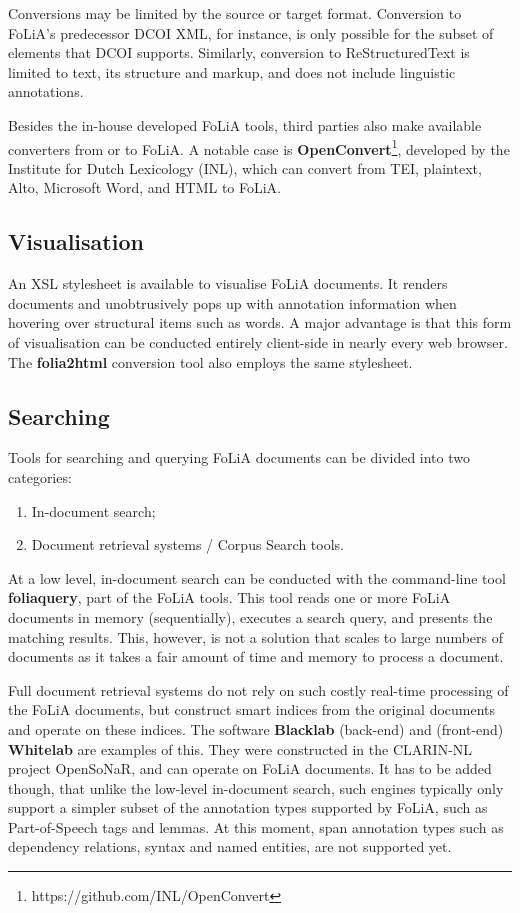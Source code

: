 \documentclass[a4paper,11pt]{article}
\begin{document}
Conversions may be limited by the source or target format. Conversion to
FoLiA's predecessor DCOI XML, for instance, is only possible for the subset of
elements that DCOI supports. Similarly, conversion to
ReStructuredText is limited
to text, its structure and markup, and does not include linguistic annotations.

Besides the in-house developed FoLiA tools, third parties also make available
converters from or to FoLiA. A notable case is
\textbf{OpenConvert}\footnote{https://github.com/INL/OpenConvert}, developed by the Institute for Dutch Lexicology (INL), which can convert from TEI, plaintext, Alto, Microsoft Word, and HTML to
FoLiA.

\subsection{Visualisation}

An XSL stylesheet is available to visualise FoLiA documents. It renders
documents and unobtrusively pops up with annotation information when hovering
over structural items such as words. A major advantage is that this form of
visualisation can be conducted entirely client-side in nearly every
web browser. The \textbf{folia2html} conversion tool also employs the same
stylesheet.

\subsection{Searching}

Tools for searching and querying FoLiA documents can be divided into two
categories:

\begin{enumerate}
 \item In-document search;
 \item Document retrieval systems / Corpus Search tools.
\end{enumerate}

At a low level, in-document search can be conducted with the command-line tool
\textbf{foliaquery}, part of the FoLiA tools. This tool reads one or more FoLiA
documents in memory (sequentially), executes a search query, and presents the
matching results. This, however, is not a solution that scales to large
numbers of documents as it takes a fair amount of time and memory to process a document.

Full document retrieval systems do not rely on such costly real-time processing
of the FoLiA documents, but construct smart indices from the original documents
and operate on these indices. The software \textbf{Blacklab} (back-end)
and (front-end) \textbf{Whitelab} \cite{ReynaertVandecampVanzaanen2014ColingDemo} are examples of this. They were
constructed in the
CLARIN-NL project OpenSoNaR, and can operate on FoLiA documents. It has to be
added though, that unlike the low-level in-document search, such engines
typically only support a simpler subset of the annotation types supported by
FoLiA, such as Part-of-Speech tags and lemmas. At this moment, span annotation
types such as dependency relations, syntax and named entities, are not
supported yet. %
\end{document}
